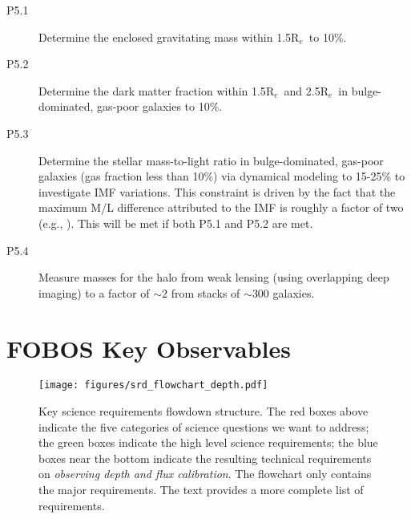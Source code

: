 \documentclass[preprint,11pt]{aastex}
\newcommand{\Reff}{{R$_{e}$}}
\begin{document}
\begin{description}


\item[P5.1] Determine the enclosed gravitating mass within 1.5\Reff\
  to
  10\%. %

\item[P5.2] Determine the dark matter fraction within 1.5\Reff\ and 2.5\Reff\ in
  bulge-dominated, gas-poor galaxies to 10\%.

\item[P5.3] Determine the stellar mass-to-light ratio in
  bulge-dominated, gas-poor galaxies (gas fraction less than 10\%) via
  dynamical modeling to 15-25\% to investigate IMF variations.  This
  constraint is driven by the fact that the maximum M/L difference
  attributed to the IMF is roughly a factor of two (e.g., \citealt{conroy2012}). This will be met if both P5.1 and P5.2 are
  met.


\item[P5.4] Measure masses for the halo from weak lensing (using overlapping deep
  imaging) to a factor of $\sim 2$ from stacks of $\sim 300$ galaxies.


\end{description}



\section{FOBOS Key Observables}\label{sec:key_observables}

\begin{figure*}
\begin{center}
\texttt{[image: figures/srd\_flowchart\_depth.pdf]}
\caption{Key science requirements flowdown structure. The red boxes above indicate the five categories of science questions we want to address; the green boxes indicate the high level science requirements; the blue boxes near the bottom indicate the resulting technical requirements on {\it observing depth and flux calibration}. The flowchart only contains the major requirements. The text provides a more complete list of requirements.}
\label{fig:srd_flowchart_depth}
\end{center}
\end{figure*}
\end{document}
